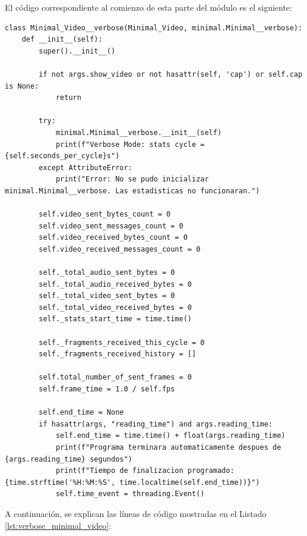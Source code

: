 El código correspondiente al comienzo de esta parte del módulo es el siguiente:

\begin{lstlisting}[style=pythonstyle, caption={Código de la inicialización de \textit{Minimal\_Video\_verbose}.}, label={lst:verbose_minimal_video}]
class Minimal_Video__verbose(Minimal_Video, minimal.Minimal__verbose):
    def __init__(self):
        super().__init__()

        if not args.show_video or not hasattr(self, 'cap') or self.cap is None:
            return

        try:
            minimal.Minimal__verbose.__init__(self)
            print(f"Verbose Mode: stats cycle = {self.seconds_per_cycle}s")
        except AttributeError:
            print("Error: No se pudo inicializar minimal.Minimal__verbose. Las estadisticas no funcionaran.")

        self.video_sent_bytes_count = 0
        self.video_sent_messages_count = 0
        self.video_received_bytes_count = 0
        self.video_received_messages_count = 0

        self._total_audio_sent_bytes = 0
        self._total_audio_received_bytes = 0
        self._total_video_sent_bytes = 0
        self._total_video_received_bytes = 0
        self._stats_start_time = time.time()

        self._fragments_received_this_cycle = 0
        self._fragments_received_history = []

        self.total_number_of_sent_frames = 0
        self.frame_time = 1.0 / self.fps

        self.end_time = None
        if hasattr(args, "reading_time") and args.reading_time:
            self.end_time = time.time() + float(args.reading_time)
            print(f"Programa terminara automaticamente despues de {args.reading_time} segundos")
            print(f"Tiempo de finalizacion programado: {time.strftime('%H:%M:%S', time.localtime(self.end_time))}")
            self.time_event = threading.Event()
\end{lstlisting}
\vspace{\baselineskip}

A continuación, se explican las líneas de código mostradas en el Listado \ref{lst:verbose_minimal_video}:

